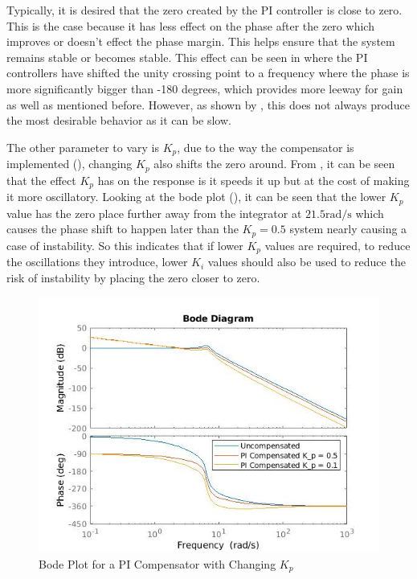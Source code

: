 \documentclass[a4paper, 11pt, compsoc]{IEEEtran}
\begin{document}
			Typically, it is desired that the zero created by the PI controller is close to zero. This is the case because it has less effect on the phase after the zero which improves or doesn't effect the phase margin. This helps ensure that the system remains stable or becomes stable. This effect can be seen in  where the PI controllers have shifted the unity crossing point to a frequency where the phase is more significantly bigger than -180 degrees, which provides more leeway for gain as well as mentioned before. However, as shown by , this does not always produce the most desirable behavior as it can be slow.
			\par
			The other parameter to vary is $K_p$, due to the way the compensator is implemented (), changing $K_p$ also shifts the zero around. From , it can be seen that the effect $K_p$ has on the response is it speeds it up but at the cost of making it more oscillatory. Looking at the bode plot (), it can be seen that the lower $K_p$ value has the zero place further away from the integrator at $21.5 \text{rad/s}$ which causes the phase shift to happen later than the $K_p = 0.5$ system nearly causing a case of instability. So this indicates that if lower $K_p$ values are required, to reduce the oscillations they introduce, lower $K_i$ values should also be used to reduce the risk of instability by placing the zero closer to zero. 
			\begin{figure}[!ht]
				\centering
				\includegraphics[width=\columnwidth]{PI_KP_Bode.jpg}
				\caption{Bode Plot for a PI Compensator with Changing $K_p$}
				\label{fig:PIKPBode}
			\end{figure}
\end{document}

